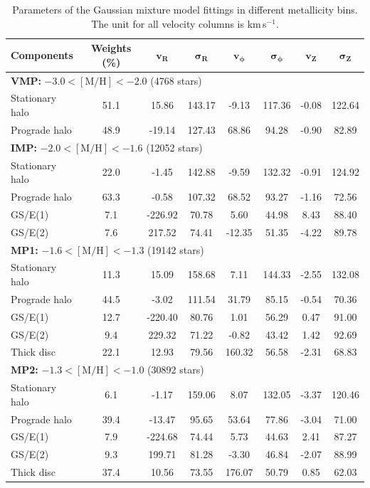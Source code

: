 \documentclass[a4paper,12pt]{article}
\begin{document}
\begin{table}
\centering
\begin{tabular}{lccccccc}
\hline
\textbf{Components} & \textbf{Weights (\%)} & $\mathbf{v_R}$ & $\boldsymbol{\sigma_R}$ & $\mathbf{v_\phi}$ & $\boldsymbol{\sigma_\phi}$ & $\mathbf{v_Z}$ & $\boldsymbol{\sigma_Z}$ \\
\hline
\multicolumn{8}{l}{\textbf{VMP:} $-3.0 < \mathrm{[M/H]} < -2.0$ (4768 stars)} \\
Stationary halo     & 51.1 & 15.86   & 143.17 &  -9.13  & 117.36 & -0.08 & 122.64 \\
Prograde halo       & 48.9 & -19.14  & 127.43 &  68.86  &  94.28 & -0.90 &  82.89 \\
\hline
\multicolumn{8}{l}{\textbf{IMP:} $-2.0 < \mathrm{[M/H]} < -1.6$ (12052 stars)} \\
Stationary halo     & 22.0 &  -1.45  & 142.88 &  -9.59  & 132.32 & -0.91 & 124.92 \\
Prograde halo       & 63.3 &  -0.58  & 107.32 &  68.52  &  93.27 & -1.16 &  72.56 \\
GS/E(1)             &  7.1 & -226.92 &  70.78 &   5.60  &  44.98 &  8.43 &  88.40 \\
GS/E(2)             &  7.6 &  217.52 &  74.41 & -12.35  &  51.35 & -4.22 &  89.78 \\
\hline
\multicolumn{8}{l}{\textbf{MP1:} $-1.6 < \mathrm{[M/H]} < -1.3$ (19142 stars)} \\
Stationary halo     & 11.3 &  15.09  & 158.68 &   7.11  & 144.33 & -2.55 & 132.08 \\
Prograde halo       & 44.5 &  -3.02  & 111.54 &  31.79  &  85.15 & -0.54 &  70.36 \\
GS/E(1)             & 12.7 & -220.40 &  80.76 &   1.01  &  56.29 &  0.47 &  91.00 \\
GS/E(2)             &  9.4 &  229.32 &  71.22 &  -0.82  &  43.42 &  1.42 &  92.69 \\
Thick disc          & 22.1 &  12.93  &  79.56 & 160.32  &  56.58 & -2.31 &  68.83 \\
\hline
\multicolumn{8}{l}{\textbf{MP2:} $-1.3 < \mathrm{[M/H]} < -1.0$ (30892 stars)} \\
Stationary halo     &  6.1 &  -1.17  & 159.06 &   8.07  & 132.05 & -3.37 & 120.46 \\
Prograde halo       & 39.4 & -13.47  &  95.65 &  53.64  &  77.86 & -3.04 &  71.00 \\
GS/E(1)             &  7.9 & -224.68 &  74.44 &   5.73  &  44.63 &  2.41 &  87.27 \\
GS/E(2)             &  9.3 &  199.71 &  81.28 &  -3.30  &  46.84 & -2.07 &  88.99 \\
Thick disc          & 37.4 &  10.56  &  73.55 & 176.07  &  50.79 &  0.85 &  62.03 \\
\hline
\end{tabular}
\caption{Parameters of the Gaussian mixture model fittings in different metallicity bins.
 The unit for all velocity columns is km\,s$^{-1}$.}
\label{tab:gmm_parameters}
\end{table}
\end{document}
